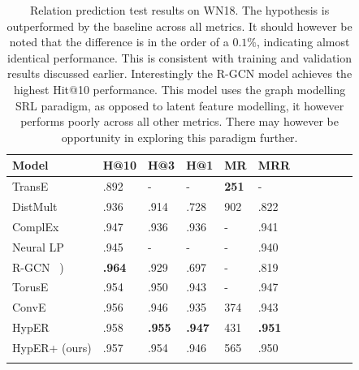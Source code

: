 
\begin{table}
		\centering
		\begin{tabular}{lllllllllll}
  			\textbf{Model} & \textbf{H@10} & \textbf{H@3} & \textbf{H@1} & \textbf{MR} & \textbf{MRR} \\
  			\hline
  			TransE \unskip~\citep{bordes2013translating} & .892 & - & - & \textbf{251} & - \\
  			DistMult \unskip~\citep{yang2014embedding} & .936 & .914 & .728 & 902 & .822 \\
  			ComplEx \unskip~\citep{trouillon2016complex} & .947 & .936 & .936 & - & .941 \\
  			Neural LP \unskip~\citep{yang2017differentiable} & .945 & - & - & - & .940 \\
			R-GCN \unskip~\citep{schlichtkrull2018modeling}) & \textbf{.964} & .929 & .697 & - & .819 \\
			TorusE \unskip~\citep{ebisu2018toruse} & .954 & .950 & .943 & - & .947 \\
			ConvE \unskip~\citep{dettmers2018convolutional} & .956 & .946 & .935 & 374 & .943 \\
			HypER \unskip~\citep{balazevic2019hypernetwork} & .958 & \textbf{.955} & \textbf{.947} & 431 & \textbf{.951} \\
  			\hline
  			HypER+ (ours) & .957 & .954 & .946 & 565 & .950 \\
			&
		\end{tabular}
		\captionsetup{justification=centering}
		\caption{Relation prediction test results on WN18. The hypothesis is outperformed by the baseline across all metrics. It should however be noted that the difference is in the order of a $ 0.1\% $, indicating almost identical performance. This is consistent with training and validation results discussed earlier. Interestingly the R-GCN model achieves the highest Hit@10 performance. This model uses the graph modelling SRL paradigm, as opposed to latent feature modelling, it however performs poorly across all other metrics. There may however be opportunity in exploring this paradigm further. }
\end{table}

